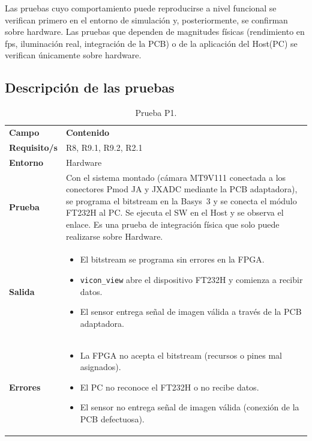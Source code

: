 \documentclass[../main.tex]{subfiles}
\begin{document}
Las pruebas cuyo comportamiento puede reproducirse a nivel funcional se verifican primero en el entorno de simulación y, posteriormente, se confirman sobre hardware. Las pruebas que dependen de magnitudes físicas (rendimiento en fps, iluminación real, integración de la PCB) o de la aplicación del Host(PC) se verifican únicamente sobre hardware.

\subsection{Descripción de las pruebas}
\label{subsec:pruebas}

\begin{table}[H]
\centering
\caption{Prueba P1.}
\label{tab:prueba_p1}
\begin{tabular}{>{\raggedright\arraybackslash}p{2.5cm}>{\raggedright\arraybackslash}p{11cm}}
\rowcolor[HTML]{156082}
{\color{white}\textbf{Campo}} & {\color{white}\textbf{Contenido}} \\
\rowcolor[HTML]{C0E6F5}
\textbf{Requisito/s} & R8, R9.1, R9.2, R2.1 \\
\textbf{Entorno} & Hardware \\
\rowcolor[HTML]{C0E6F5}
\textbf{Prueba} & Con el sistema montado (cámara MT9V111 conectada a los conectores Pmod JA y JXADC mediante la PCB adaptadora), se programa el bitstream en la Basys~3 y se conecta el módulo FT232H al PC. Se ejecuta el \ac{SW} en el Host y se observa el enlace. Es una prueba de integración física que solo puede realizarse sobre Hardware. \\
\textbf{Salida} & \begin{itemize}\setlength{\itemsep}{0pt}
    \item El bitstream se programa sin errores en la FPGA.
    \item \texttt{vicon\_view} abre el dispositivo FT232H y comienza a recibir datos.
    \item El sensor entrega señal de imagen válida a través de la PCB adaptadora.
\end{itemize} \\
\rowcolor[HTML]{C0E6F5}
\textbf{Errores} & \begin{itemize}\setlength{\itemsep}{0pt}
    \item La FPGA no acepta el bitstream (recursos o pines mal asignados).
    \item El PC no reconoce el FT232H o no recibe datos.
    \item El sensor no entrega señal de imagen válida (conexión de la PCB defectuosa).
\end{itemize} \\
\end{tabular}
\end{table}
\end{document}
